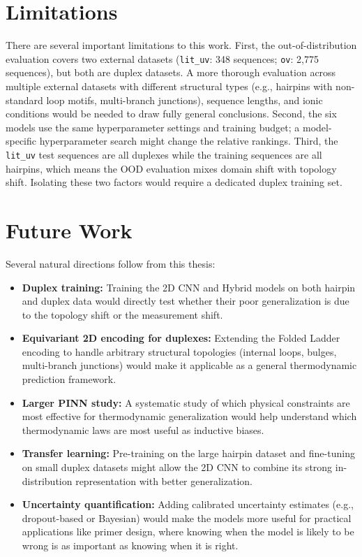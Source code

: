 \documentclass[12pt,oneside,letterpaper]{report}
\begin{document}
\section{Limitations}

There are several important limitations to this work. First, the out-of-distribution evaluation covers two external datasets (\texttt{lit\_uv}: 348 sequences; \texttt{ov}: 2,775 sequences), but both are duplex datasets. A more thorough evaluation across multiple external datasets with different structural types (e.g., hairpins with non-standard loop motifs, multi-branch junctions), sequence lengths, and ionic conditions would be needed to draw fully general conclusions. Second, the six models use the same hyperparameter settings and training budget; a model-specific hyperparameter search might change the relative rankings. Third, the \texttt{lit\_uv} test sequences are all duplexes while the training sequences are all hairpins, which means the OOD evaluation mixes domain shift with topology shift. Isolating these two factors would require a dedicated duplex training set.

\section{Future Work}

Several natural directions follow from this thesis:

\begin{itemize}
    \item \textbf{Duplex training:} Training the 2D CNN and Hybrid models on both hairpin and duplex data would directly test whether their poor generalization is due to the topology shift or the measurement shift.
    \item \textbf{Equivariant 2D encoding for duplexes:} Extending the Folded Ladder encoding to handle arbitrary structural topologies (internal loops, bulges, multi-branch junctions) would make it applicable as a general thermodynamic prediction framework.
    \item \textbf{Larger PINN study:} A systematic study of which physical constraints are most effective for thermodynamic generalization would help understand which thermodynamic laws are most useful as inductive biases.
    \item \textbf{Transfer learning:} Pre-training on the large hairpin dataset and fine-tuning on small duplex datasets might allow the 2D CNN to combine its strong in-distribution representation with better generalization.
    \item \textbf{Uncertainty quantification:} Adding calibrated uncertainty estimates (e.g., dropout-based or Bayesian) would make the models more useful for practical applications like primer design, where knowing when the model is likely to be wrong is as important as knowing when it is right.
\end{itemize}
\end{document}
